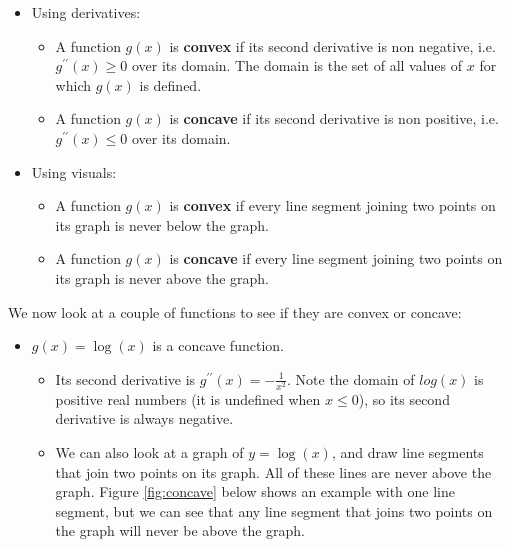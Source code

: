 \documentclass[
]{book}
\providecommand{\tightlist}{%
  \setlength{\itemsep}{0pt}\setlength{\parskip}{0pt}}
\begin{document}
\begin{itemize}
\tightlist
\item
  Using derivatives:

  \begin{itemize}
  \tightlist
  \item
    A function \(g(x)\) is \textbf{convex} if its second derivative is non negative, i.e.~\(g^{\prime \prime}(x) \geq 0\) over its domain. The domain is the set of all values of \(x\) for which \(g(x)\) is defined.
  \item
    A function \(g(x)\) is \textbf{concave} if its second derivative is non positive, i.e.~\(g^{\prime \prime}(x) \leq 0\) over its domain.
  \end{itemize}
\item
  Using visuals:

  \begin{itemize}
  \tightlist
  \item
    A function \(g(x)\) is \textbf{convex} if every line segment joining two points on its graph is never below the graph.
  \item
    A function \(g(x)\) is \textbf{concave} if every line segment joining two points on its graph is never above the graph.
  \end{itemize}
\end{itemize}

We now look at a couple of functions to see if they are convex or concave:

\begin{itemize}
\tightlist
\item
  \(g(x) = \log(x)\) is a concave function.

  \begin{itemize}
  \tightlist
  \item
    Its second derivative is \(g^{\prime \prime}(x) = -\frac{1}{x^2}\). Note the domain of \(log(x)\) is positive real numbers (it is undefined when \(x \leq 0\)), so its second derivative is always negative.
  \item
    We can also look at a graph of \(y = \log(x)\), and draw line segments that join two points on its graph. All of these lines are never above the graph. Figure \ref{fig:concave} below shows an example with one line segment, but we can see that any line segment that joins two points on the graph will never be above the graph.
  \end{itemize}
\end{itemize}
\end{document}
